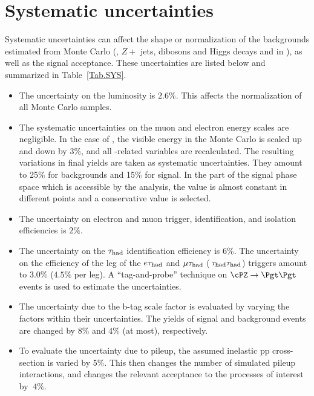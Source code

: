 \section{Systematic uncertainties}
\label{sect:sys}
Systematic uncertainties can affect the shape or normalization of the
backgrounds estimated from Monte Carlo (\ttbar, $Z+$ jets, dibosons and Higgs decays and \wjets in \tauTau \bintwo), 
as well as the signal acceptance.
These uncertainties are listed below and summarized in Table~\ref{Tab.SYS}.


\begin{itemize}

\item The uncertainty on the luminosity  is $2.6\%$.  This affects the
  normalization of all Monte Carlo samples.
 
\item  The systematic uncertainties on the muon and electron energy scales
  are negligible.  In the case of \Tau, the visible energy in the Monte Carlo
  is scaled up and down by $3\%$, and all \Tau-related variables are
  recalculated.  The resulting variations in final yields are taken as
  systematic
  uncertainties.  They amount to 25\% for backgrounds and 15\% for signal.
  In the part of the signal phase space which is accessible by the analysis,
  the value is almost constant in different points and a conservative value is selected.

\item The uncertainty on electron and muon trigger, identification, and
  isolation efficiencies is $2\%$.

\item The uncertainty on the $\tau_{\rm had}$ identification efficiency is $6\%$. 
  The uncertainty on the efficiency of the \Tau leg of the $e\tau_{\rm had}$ and
  $\mu\tau_{\rm had}$ ($\,\tau_{\rm had}\tau_{\rm had}$) triggers amount to $3.0\%$ ($4.5\%$ per leg).
  A ``tag-and-probe'' technique on $\cPZ\to \Pgt\Pgt$ events is used to estimate the 
  uncertainties.

\item The uncertainty due to the b-tag scale factor is evaluated by varying the 
factors within their uncertainties. The yields of signal and background events are changed by 8\% 
and 4\% (at most), respectively.
 
\item To evaluate the uncertainty due to pileup, the assumed inelastic
  pp cross-section is varied by 5\%.  This then changes the number
  of simulated pileup interactions, and changes the relevant acceptance
  to the processes of interest by $~4 \%$.


\end{itemize}
